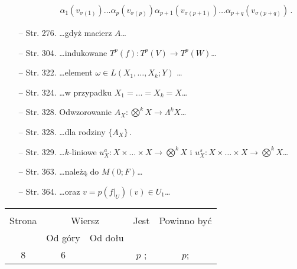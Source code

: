 \documentclass[a4paper,11pt]{article}
\begin{document}
\begin{itemize}
\begin{displaymath}
\begin{split}
      & \quad \qquad \alpha_{ 1 } ( v_{ \sigma( 1 ) } ) \ldots \alpha_{ p } ( v_{ \sigma ( p ) } ) \alpha_{ p
        + 1 } ( v_{ \sigma( p + 1 ) } ) \ldots \alpha_{ p + q } ( v_{ \sigma ( p + q ) } )
      \, .
    \end{split}
  \end{displaymath}
\item[--] Str. 276. \ldots gdyż macierz $A$\ldots
\item[--] Str. 304. \ldots indukowane
  $T^{ p } ( f ) : T^{ p } ( V ) \rightarrow T^{ p } (W)$\ldots
\item[--] Str. 322. \ldots element $\omega \in L( X_{ 1 } ,\ldots, X_{ k }; Y )$ \ldots
\item[--] Str. 324. \ldots w przypadku $X_{ 1 } = \ldots = X_{ k } = X$\ldots
\item[--] Str. 328. Odwzorowanie
  $A_{ X } : \bigotimes^{ k } X \rightarrow \Lambda^{ k } X$\ldots
\item[--] Str. 328. \ldots dla rodziny $\{ A_{ X } \} \, .$
\item[--] Str. 329. \ldots $k$-liniowe
  $u^{ a }_{ X } : X \times \ldots \times X \rightarrow \bigotimes^{ k } X$ i
  $u^{ s }_{ X } : X \times \ldots \times X \rightarrow \bigotimes^{ k } X$\ldots
\item[--] Str. 363. \ldots należą do $M( 0; F )$\ldots
\item[--] Str. 364. \ldots oraz $v = p( f |_{ U } ) ( v ) \in U_{ 1 }$\ldots
\end{itemize}









\begin{center}
  \begin{tabular}{|c|c|c|c|c|}
    \hline
    & \multicolumn{2}{c|}{} & & \\
    Strona & \multicolumn{2}{c|}{Wiersz} & Jest
                              & Powinno być \\ \cline{2-3}
    & Od góry & Od dołu & & \\
    \hline
    8   & 6 & & $p$ ; & $p$; \\
    \hline
  \end{tabular}
\end{center}
\end{document}
